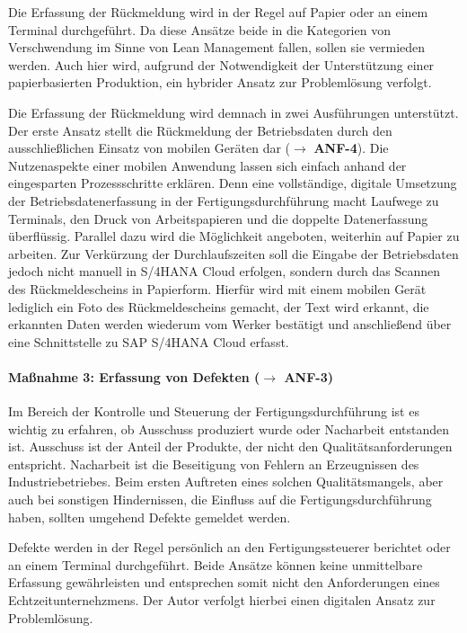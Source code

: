 Die Erfassung der Rückmeldung wird in der Regel auf Papier oder an einem Terminal durchgeführt. Da diese Ansätze beide in die Kategorien von Verschwendung im Sinne von Lean Management fallen, sollen sie vermieden werden.
Auch hier wird, aufgrund der Notwendigkeit der Unterstützung einer papierbasierten Produktion, ein hybrider Ansatz zur Problemlösung verfolgt.

Die Erfassung der Rückmeldung wird demnach in zwei Ausführungen unterstützt. Der erste Ansatz stellt die Rückmeldung der Betriebsdaten durch den ausschließlichen Einsatz von mobilen Geräten dar
($\rightarrow$ \textbf{ANF-4}).
Die Nutzenaspekte einer mobilen Anwendung lassen sich einfach anhand der eingesparten Prozessschritte erklären.
Denn eine vollständige, digitale Umsetzung der Betriebsdatenerfassung in der Fertigungsdurchführung macht Laufwege zu Terminals, den Druck von Arbeitspapieren und die doppelte Datenerfassung überflüssig.
Parallel dazu wird die Möglichkeit angeboten, weiterhin auf Papier zu arbeiten. Zur Verkürzung der Durchlaufszeiten soll die Eingabe der Betriebsdaten jedoch nicht manuell in S/4HANA Cloud erfolgen, sondern durch das Scannen des Rückmeldescheins in Papierform. Hierfür wird mit einem mobilen Gerät lediglich ein Foto des Rückmeldescheins gemacht, der Text wird erkannt, die erkannten Daten werden wiederum vom Werker bestätigt und anschließend über eine Schnittstelle zu SAP S/4HANA Cloud erfasst.

\paragraph{Maßnahme 3: Erfassung von Defekten ($\rightarrow$ \textbf{ANF-3})}
Im Bereich der Kontrolle und Steuerung der Fertigungsdurchführung ist es wichtig zu erfahren, ob Ausschuss produziert wurde oder Nacharbeit entstanden ist. Ausschuss ist der Anteil der Produkte, der nicht den Qualitätsanforderungen entspricht.
Nacharbeit ist die Beseitigung von Fehlern an Erzeugnissen des Industriebetriebes.
Beim ersten Auftreten eines solchen Qualitätsmangels, aber auch bei sonstigen Hindernissen, die Einfluss auf die Fertigungsdurchführung haben, sollten umgehend Defekte gemeldet werden.



Defekte werden in der Regel persönlich an den Fertigungssteuerer berichtet oder an einem Terminal durchgeführt. Beide Ansätze können keine unmittelbare Erfassung gewährleisten und entsprechen somit nicht den Anforderungen eines Echtzeitunternehzmens.
Der Autor verfolgt hierbei einen digitalen Ansatz zur Problemlösung.

